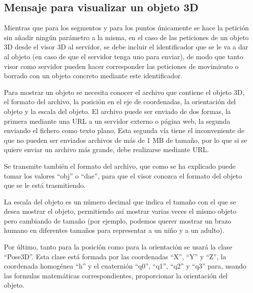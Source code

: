 \subsection{Mensaje para visualizar un objeto 3D}
Mientras que para los segmentos y para los puntos únicamente se hace la petición sin añadir ningún parámetro a la misma, en el caso de las peticiones de un objeto 3D desde el visor 3D al servidor, se debe incluir el identificador que se le va a dar al objeto (en caso de que el servidor tenga uno para enviar), de modo que tanto visor como servidor pueden hacer corresponder las peticiones de movimiento o borrado con un objeto concreto mediante este identificador.

Para mostrar un objeto se necesita conocer el archivo que contiene el objeto 3D, el formato del archivo, la posición en el eje de coordenadas, la orientación del objeto y la escala del objeto. 
El archivo puede ser enviado de dos formas, la primera mediante una URL a un servidor externo o página web, la segunda enviando el fichero como texto plano. Esta segunda vía tiene el inconveniente de que no pueden ser enviados archivos de más de 1 MB de tamaño, por lo que si se quiere enviar un archivo más grande, debe realizarse mediante URL.

Se transmite también el formato del archivo, que como se ha explicado puede tomar los valores ``obj'' o ``dae'', para que el visor conozca el formato del objeto que se le está trasmitiendo.

La escala del objeto es un número decimal que indica el tamaño con el que se desea mostrar el objeto, permitiendo así mostrar varias veces el mismo objeto pero cambiando de tamaño (por ejemplo, podemos querer mostrar un brazo humano en diferentes tamaños para representar a un niño y a un adulto).

Por último, tanto para la posición como para la orientación se usará la clase ``Pose3D''. Esta clase está formada por las coordenadas ``X'', ``Y'' y ``Z'', la coordenada homogénea ``h'' y el cuaternión ``q0'', ``q1'', ``q2'' y ``q3'' para, usando las formulas matemáticas correspondientes, proporcionar la orientación del objeto.

